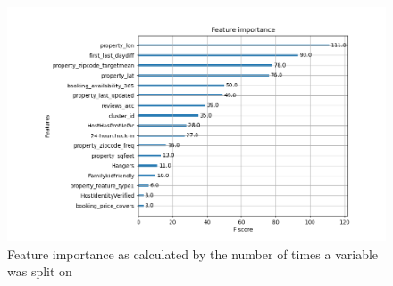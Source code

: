 \documentclass[11pt, oneside]{article}   	%
\begin{document}
\begin{figure}[h!]
\centering
	\includegraphics[width=1\linewidth]{FI_final}
\caption{Feature importance as calculated by the number of times a variable was split on}
\label{figure label}

\end{figure}
\end{document}
